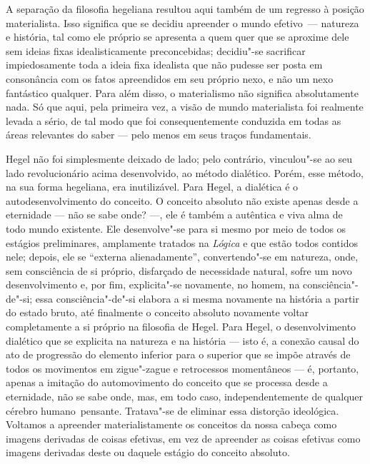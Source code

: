 A separação da filosofia hegeliana resultou aqui também de um regresso à
posição materialista. Isso significa que se decidiu apreender o mundo
efetivo\est\ --- natureza e história, tal como ele próprio se apresenta a quem %
quer que se aproxime dele sem ideias fixas
idealisticamente preconcebidas; decidiu"-se sacrificar impiedosamente
toda a ideia fixa idealista que não pudesse ser posta em consonância com
os fatos apreendidos em seu próprio nexo, e não um nexo fantástico
qualquer. Para além disso, o materialismo não significa absolutamente
nada. Só que aqui, pela primeira vez, a visão de mundo materialista foi
realmente levada a sério, de tal modo que foi consequentemente conduzida
em todas as áreas relevantes do saber --- pelo menos em seus traços
fundamentais.

Hegel não
foi simplesmente deixado de lado; pelo contrário, vinculou"-se ao seu
lado revolucionário acima desenvolvido, ao método dialético. Porém, esse
método, na sua forma hegeliana, era inutilizável.
Para Hegel,
a dialética é o autodesenvolvimento do conceito. O conceito absoluto não
existe apenas desde a eternidade --- não se sabe onde? ---, ele é também a %
autêntica e viva alma de todo mundo existente. Ele desenvolve"-se para si
mesmo por meio de todos os estágios preliminares, amplamente tratados na
\emph{Lógica} e que estão todos contidos nele; depois, ele se ``externa
alienadamente'', convertendo"-se em natureza, onde, sem consciência de si
próprio, disfarçado de necessidade natural, sofre um novo
desenvolvimento e, por fim, explicita"-se novamente, no homem, na
consciência"-de"-si; essa consciência"-de"-si elabora a si mesma
novamente na história a partir do estado bruto, até
finalmente o conceito absoluto novamente voltar completamente a si
próprio na filosofia
de Hegel.
Para Hegel,
o desenvolvimento dialético que se explicita na natureza e na história ---
isto é, a conexão causal do ato de progressão do elemento inferior para
o superior que se impõe através de todos os movimentos em zigue"-zague e
retrocessos momentâneos --- é, portanto, apenas a imitação 
do automovimento do conceito que se processa desde a
eternidade, não se sabe onde, mas, em todo caso, independentemente de
qualquer cérebro humano\est\ pensante. Tratava"-se de eliminar essa distorção
ideológica. Voltamos a apreender materialistamente os conceitos da nossa
cabeça como imagens derivadas de coisas efetivas, em 
vez de apreender as coisas efetivas como imagens derivadas
deste ou daquele estágio do conceito absoluto. 
